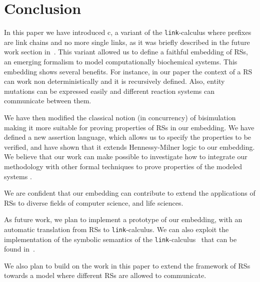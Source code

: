 
\section{Conclusion}\label{sec:conclusion}

In this paper we have introduced c\CNA, a variant of the {\tt link}-calculus
where prefixes are link chains and no more single links, as it was 
briefly described in the future work section in~\cite{BBB17}.
This variant allowed us to define 
a faithful embedding of 
RSs,
an emerging formalism to model computationally biochemical systems.
This {\color{red} embedding}
shows several benefits.
For instance, in our paper the context of a RS can work non deterministically and it 
is recursively defined.
Also, entity mutations can be expressed easily and different reaction systems can
communicate between them.

We have then modified the classical notion (in concurrency) of bisimulation
making it more suitable for proving properties of 
RSs
in our
{\color{red} embedding.}
We have defined a new assertion language, which allows us to specify
the properties to be verified, and have shown that it extends Hennessy-Milner logic
to our 
{\color{red} embedding.}
We believe that our work can make 
possible to investigate how to integrate our methodology
with other formal techniques to prove 
properties of the modeled systems \cite{CFHOT15,OCHF16,BBGLBH2017}.

We are confident that our embedding can contribute to extend the applications
of 
RSs
to diverse fields of computer science, and life
sciences.

As future work, we plan to implement a prototype of our 
{\color{red} embedding,}
with an automatic translation from RSs to  {\tt link}-calculus. 
We can also exploit the implementation of  the symbolic semantics of 
the {\tt link}-calculus~\cite{BrodoO17} that can be found in~\cite{tool}.

We also plan to build on the work in this paper to extend the framework
of RSs towards a model where different RSs are allowed to communicate.
